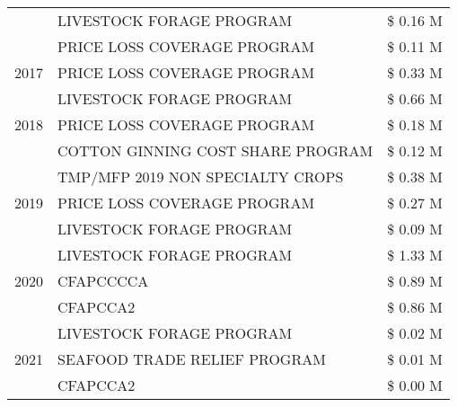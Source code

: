 \begin{tabular}{llr}
 & LIVESTOCK FORAGE PROGRAM                      & \$ 0.16 M \\
 & PRICE LOSS COVERAGE PROGRAM                   & \$ 0.11 M \\
\cline{1-3}
2017 & PRICE LOSS COVERAGE PROGRAM & \$ 0.33 M \\
\cline{1-3}
\multirow[t]{3}{*}{2018} & LIVESTOCK FORAGE PROGRAM & \$ 0.66 M \\
 & PRICE LOSS COVERAGE PROGRAM & \$ 0.18 M \\
 & COTTON GINNING COST SHARE PROGRAM & \$ 0.12 M \\
\cline{1-3}
\multirow[t]{3}{*}{2019} & TMP/MFP 2019 NON SPECIALTY CROPS & \$ 0.38 M \\
 & PRICE LOSS COVERAGE PROGRAM & \$ 0.27 M \\
 & LIVESTOCK FORAGE PROGRAM & \$ 0.09 M \\
\cline{1-3}
\multirow[t]{3}{*}{2020} & LIVESTOCK FORAGE PROGRAM & \$ 1.33 M \\
 & CFAPCCCCA & \$ 0.89 M \\
 & CFAPCCA2 & \$ 0.86 M \\
\cline{1-3}
\multirow[t]{3}{*}{2021} & LIVESTOCK FORAGE PROGRAM & \$ 0.02 M \\
 & SEAFOOD TRADE RELIEF PROGRAM & \$ 0.01 M \\
 & CFAPCCA2 & \$ 0.00 M \\
\cline{1-3}
\bottomrule
\end{tabular}
